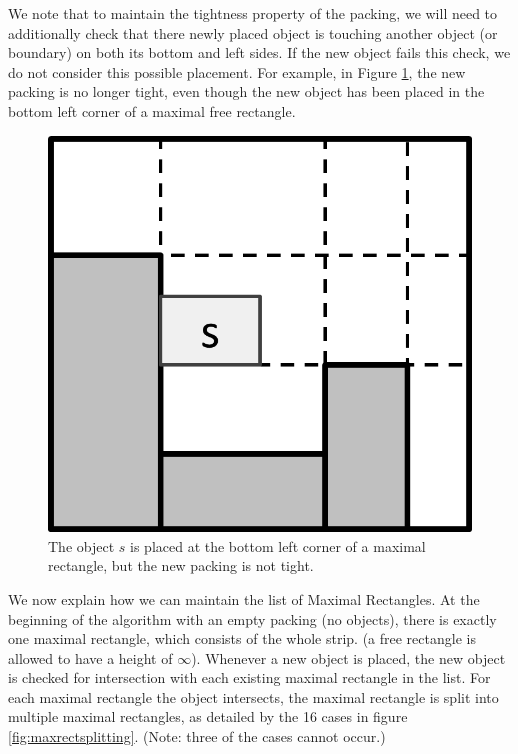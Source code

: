 \documentclass{article}
\begin{document}
We note that to maintain the tightness property of the packing, we will need to additionally check that there newly placed object is touching another object (or boundary) on both its bottom and left sides. If the new object fails this check, we do not consider this possible placement. For example, in Figure \ref{fig:floatingmaxrect}, the new packing is no longer tight, even though the new object has been placed in the bottom left corner of a maximal free rectangle.

\begin{figure}[!h]
  \centering
  \includegraphics[width=.4\linewidth]{diagrams/floatingmaxrect.png}
  \caption{The object $s$ is placed at the bottom left corner of a maximal rectangle, but the new packing is not tight.}
  \label{fig:floatingmaxrect}
\end{figure}

We now explain how we can maintain the list of Maximal Rectangles. At the beginning of the algorithm with an empty packing (no objects), there is exactly one maximal rectangle, which consists of the whole strip. (a free rectangle is allowed to have a height of $\infty$). Whenever a new object is placed, the new object is checked for intersection with each existing maximal rectangle in the list. For each maximal rectangle the object intersects, the maximal rectangle is split into multiple maximal rectangles, as detailed by the 16 cases in figure \ref{fig:maxrectsplitting}. (Note: three of the cases cannot occur.)
\end{document}
